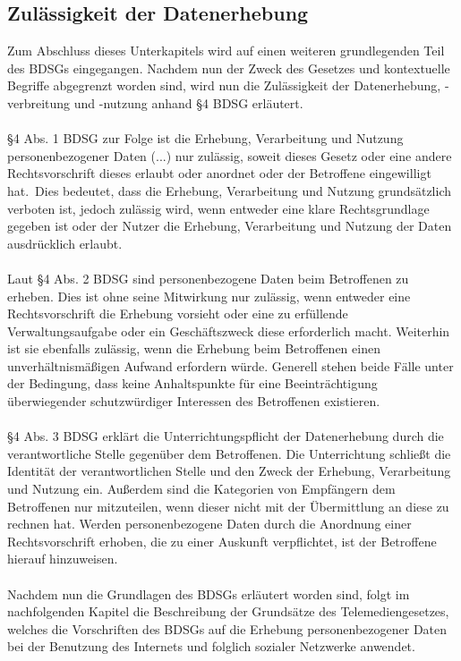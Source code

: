 \subsection{Zulässigkeit der Datenerhebung}
Zum Abschluss dieses Unterkapitels wird auf einen weiteren grundlegenden Teil des BDSGs eingegangen. Nachdem nun der Zweck des Gesetzes und kontextuelle Begriffe abgegrenzt worden sind, wird nun die Zulässigkeit der Datenerhebung, -verbreitung und -nutzung anhand \S 4 BDSG erläutert.\\
\\\S 4 Abs. 1 BDSG zur Folge ist die \glqq Erhebung, Verarbeitung und Nutzung personenbezogener Daten (...) nur zulässig, soweit dieses Gesetz oder eine andere Rechtsvorschrift dieses erlaubt oder anordnet oder der Betroffene eingewilligt hat.\grqq \ Dies bedeutet, dass die Erhebung, Verarbeitung und Nutzung grundsätzlich verboten ist, jedoch zulässig wird, wenn entweder eine klare Rechtsgrundlage gegeben ist oder der Nutzer die Erhebung, Verarbeitung und Nutzung der Daten ausdrücklich erlaubt.\\
\\Laut \S 4 Abs. 2 BDSG sind personenbezogene Daten beim Betroffenen zu erheben. Dies ist ohne seine Mitwirkung nur zulässig, wenn entweder eine Rechtsvorschrift die Erhebung vorsieht oder eine zu erfüllende Verwaltungsaufgabe oder ein Geschäftszweck diese erforderlich macht. Weiterhin ist sie ebenfalls zulässig, wenn \glqq die Erhebung beim Betroffenen einen unverhältnismäßigen Aufwand erfordern würde\grqq. Generell stehen beide Fälle unter der Bedingung, dass keine Anhaltspunkte für eine Beeinträchtigung überwiegender schutzwürdiger Interessen des Betroffenen existieren.\\
\\\S 4 Abs. 3 BDSG erklärt die Unterrichtungspflicht der Datenerhebung durch die verantwortliche Stelle gegenüber dem Betroffenen. Die Unterrichtung schließt die Identität der verantwortlichen Stelle und den Zweck der Erhebung, Verarbeitung und Nutzung ein. Außerdem sind die Kategorien von Empfängern dem Betroffenen nur mitzuteilen, wenn dieser nicht mit der Übermittlung an diese zu rechnen hat. Werden personenbezogene Daten durch die Anordnung einer Rechtsvorschrift erhoben, die zu einer Auskunft verpflichtet, ist der Betroffene hierauf hinzuweisen.\\
\\Nachdem nun die Grundlagen des BDSGs erläutert worden sind, folgt im nachfolgenden Kapitel die Beschreibung der Grundsätze des Telemediengesetzes, welches die Vorschriften des BDSGs auf die Erhebung personenbezogener Daten bei der Benutzung des Internets und folglich sozialer Netzwerke anwendet.